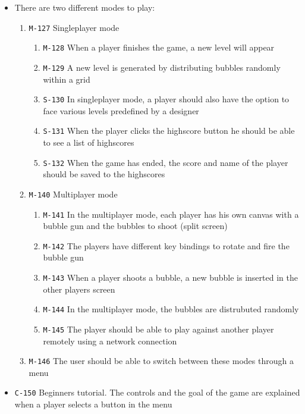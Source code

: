 \documentclass[a4paper]{article}
\begin{document}
\begin{itemize}
  \item There are two different modes to play:
  \begin{enumerate}
  
      \item \texttt{M-127} Singleplayer mode
      \begin{enumerate}
          \item \texttt{M-128} When a player finishes the game, a new level will appear
          \item \texttt{M-129} A new level is generated by distributing bubbles randomly within a grid
          \item \texttt{S-130} In singleplayer mode, a player should also have the option to face various levels predefined by a designer
          \item \texttt{S-131} When the player clicks the highscore button he should be able to see a list of highscores
  	      \item \texttt{S-132} When the game has ended, the score and name of the player should be saved to the highscores
      \end{enumerate}


      \item \texttt{M-140} Multiplayer mode
      \begin{enumerate}
          \item \texttt{M-141} In the multiplayer mode, each player has his own canvas with a bubble gun and the bubbles to shoot (split screen)
          \item \texttt{M-142} The players have different key bindings to rotate and fire the bubble gun
          \item \texttt{M-143} When a player shoots a bubble, a new bubble is inserted in the other players screen
          \item \texttt{M-144} In the multiplayer mode, the bubbles are distrubuted randomly
          \item \texttt{M-145} The player should be able to play against another player remotely using a network connection
      \end{enumerate}
      
      \item \texttt{M-146} The user should be able to switch between these modes through a menu
  \end{enumerate}
  \item \texttt{C-150} Beginners tutorial. The controls and the goal of the game are explained when a player selects a button in the menu
  

\end{itemize}
\end{document}
